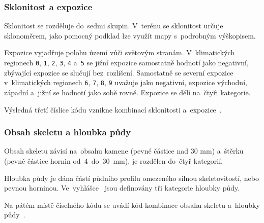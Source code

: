 \subsubsection{Sklonitost a expozice}
\label{sklonitost_expozice}

Sklonitost se rozděluje do~sedmi skupin. V~terénu se sklonitost určuje sklonoměrem, jako pomocný podklad lze využít mapy s~podrobným výškopisem.

Expozice vyjadřuje polohu území  vůči světovým stranám. V~klimatických regionech \texttt{0}, \texttt{1}, \texttt{2}, \texttt{3}, \texttt{4} a~\texttt{5} se jižní expozice samostatně hodnotí jako negativní, zbývající expozice se slučují bez~rozlišení. Samostatně se severní expozice v~klimatických regionech \texttt{6}, \texttt{7}, \texttt{8}, \texttt{9} uvažuje jako negativní, expozice východní, západní a~jižní se hodnotí jako sobě rovné. Expozice se dělí na~čtyři kategorie.

Výsledná třetí číslice kódu  vznikne kombinací sklonitosti a~expozice~\citep{vyhlaska_327}.

\subsubsection{Obsah skeletu a hloubka půdy}
\label{hloubka_pudy_obsah_skeletu}

Obsah skeletu závisí na~obsahu kamene (pevné částice nad 30 mm) a~štěrku (pevné částice hornin od~4~do~30~mm), je rozdělen do~čtyř kategorií.

Hloubka půdy je dána částí půdního profilu omezeného silnou skeletovitostí, nebo pevnou horninou. Ve~vyhlášce~\citep{vyhlaska_327} jsou definovány tři kategorie hloubky půdy.

Na pátém místě číselného kódu  se uvádí kód kombinace obsahu skeletu a~hloubky půdy~\citep{vyhlaska_327}.
